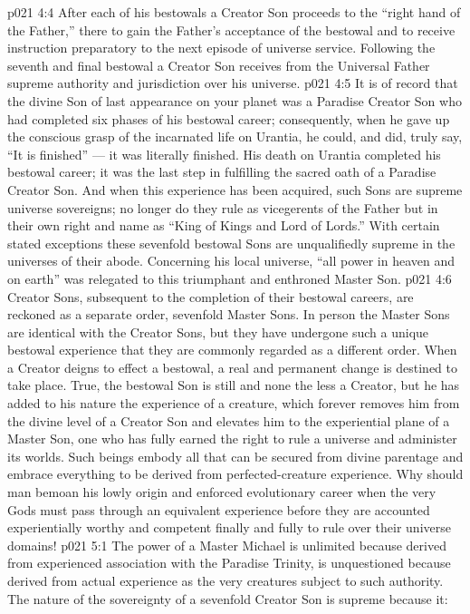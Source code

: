 \vs p021 4:4 After each of his bestowals a Creator Son proceeds to the “right hand of the Father,” there to gain the Father’s acceptance of the bestowal and to receive instruction preparatory to the next episode of universe service. Following the seventh and final bestowal a Creator Son receives from the Universal Father supreme authority and jurisdiction over his universe.
\vs p021 4:5 \pc It is of record that the divine Son of last appearance on your planet was a Paradise Creator Son who had completed six phases of his bestowal career; consequently, when he gave up the conscious grasp of the incarnated life on Urantia, he could, and did, truly say, \textcolor{ubdarkred}{“It is finished”} --- it was literally finished. His death on Urantia completed his bestowal career; it was the last step in fulfilling the sacred oath of a Paradise Creator Son. And when this experience has been acquired, such Sons are supreme universe sovereigns; no longer do they rule as vicegerents of the Father but in their own right and name as “King of Kings and Lord of Lords.” With certain stated exceptions these sevenfold bestowal Sons are unqualifiedly supreme in the universes of their abode. Concerning his local universe, “all power in heaven and on earth” was relegated to this triumphant and enthroned Master Son.
\vs p021 4:6 \pc Creator Sons, subsequent to the completion of their bestowal careers, are reckoned as a separate order, sevenfold Master Sons. In person the Master Sons are identical with the Creator Sons, but they have undergone such a unique bestowal experience that they are commonly regarded as a different order. When a Creator deigns to effect a bestowal, a real and permanent change is destined to take place. True, the bestowal Son is still and none the less a Creator, but he has added to his nature the experience of a creature, which forever removes him from the divine level of a Creator Son and elevates him to the experiential plane of a Master Son, one who has fully earned the right to rule a universe and administer its worlds. Such beings embody all that can be secured from divine parentage and embrace everything to be derived from perfected\hyp{}creature experience. Why should man bemoan his lowly origin and enforced evolutionary career when the very Gods must pass through an equivalent experience before they are accounted experientially worthy and competent finally and fully to rule over their universe domains!
\vs p021 5:1 The power of a Master Michael is unlimited because derived from experienced association with the Paradise Trinity, is unquestioned because derived from actual experience as the very creatures subject to such authority. The nature of the sovereignty of a sevenfold Creator Son is supreme because it:
